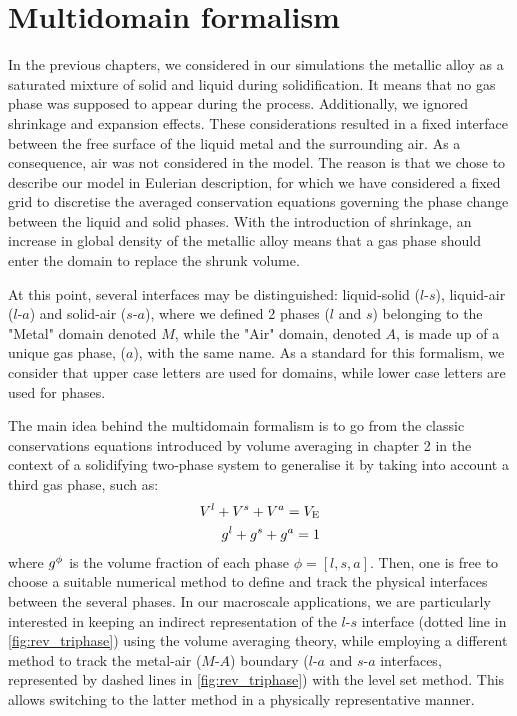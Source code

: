 \section{Multidomain formalism}
In the previous chapters, we considered in our simulations the metallic alloy as a 
saturated mixture of solid and liquid during solidification.
It means that no gas phase was supposed to appear during the process.
Additionally, we ignored shrinkage and expansion effects. These considerations
resulted in a fixed interface between the free surface of the liquid metal and the surrounding air.
As a consequence, air was not considered in the model.
The reason is that we chose to describe our model in Eulerian description, 
for which we have considered a fixed grid to discretise the averaged conservation 
equations governing the phase change between the liquid and solid phases.
With the introduction of shrinkage, an increase in global density of the metallic alloy means 
that a gas phase should enter the domain to replace the shrunk volume.

At this point, several interfaces may be distinguished: liquid-solid ($l$-$s$), liquid-air ($l$-$a$) and solid-air ($s$-$a$), where 
we defined 2 phases ($l$ and $s$) belonging to the "Metal" domain denoted $M$, while the "Air" domain, denoted $A$, 
is made up of a unique gas phase, ($a$), with the same name. As a standard for this formalism, we consider that upper case letters
are used for domains, while lower case letters are used for phases.

The main idea behind the multidomain formalism is to go from the classic 
conservations equations introduced by volume averaging in chapter 2
in the context of a solidifying two-phase system to generalise it by taking
into account a third gas phase, such as:
\begin{align}
\label{eq:}
V^l + V^s + V^a = V_\text{E} \\
{g^l} + {g^s} + {g^a} = 1
\end{align} 
where ${g^{\phi}} $ is the volume fraction of each phase $\phi=[l,s,a]$.
Then, one is free to choose a suitable numerical method to define and track the 
physical interfaces between the several phases. In our macroscale applications, we are particularly 
interested in keeping an indirect representation of the $l$-$s$ interface (dotted line in \cref{fig:rev_triphase})
using the volume averaging theory, while employing a different
method to track the metal-air ($M$-$A$) boundary ($l$-$a$ and $s$-$a$ interfaces, represented by dashed lines in \cref{fig:rev_triphase}) with the level set method. 
This allows switching to the latter method in a physically representative manner.

